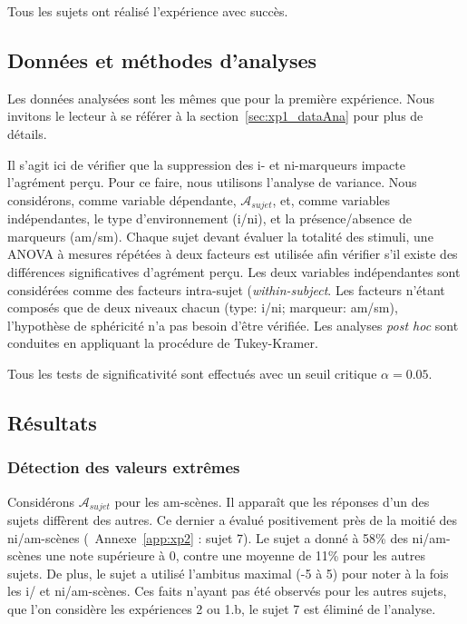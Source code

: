 \documentclass[twoside,twocolumn]{article}
\begin{document}
Tous les sujets ont réalisé l'expérience avec succès. 

\subsection{Données et méthodes d'analyses}

Les données analysées sont les mêmes que pour la première expérience. Nous invitons le lecteur à se référer à la section~\ref{sec:xp1_dataAna} pour plus de détails.
 
Il s'agit ici de vérifier que la suppression des i- et ni-marqueurs impacte l'agrément perçu. Pour ce faire, nous utilisons l'analyse de variance. Nous considérons, comme variable dépendante, $\mathcal{A}_{sujet}$, et, comme variables indépendantes, le type d'environnement (i/ni), et la présence/absence de marqueurs (am/sm). Chaque sujet devant évaluer la totalité des stimuli, une ANOVA à mesures répétées à deux facteurs est utilisée afin vérifier s'il existe des différences significatives d'agrément perçu. Les deux variables indépendantes sont considérées comme des facteurs intra-sujet (\emph{within-subject}. Les facteurs n'étant composés que de deux niveaux chacun (type: i/ni; marqueur: am/sm), l'hypothèse de sphéricité n'a pas besoin d'être vérifiée. Les analyses \emph{post hoc} sont conduites en appliquant la procédure de Tukey-Kramer.

Tous les tests de significativité sont effectués avec un seuil critique $\alpha=0.05$.

\subsection{Résultats}

\subsubsection{Détection des valeurs extrêmes} 

Considérons $\mathcal{A}_{sujet}$ pour les am-scènes. Il apparaît que les réponses d'un des sujets diffèrent des autres. Ce dernier a évalué positivement près de la moitié des ni/am-scènes (\cf~Annexe~\ref{app:xp2} : sujet 7). Le sujet a donné à 58\% des ni/am-scènes une note supérieure à 0, contre une moyenne de 11\% pour les autres sujets. De plus, le sujet a utilisé l'ambitus maximal (-5 à 5) pour noter à la fois les i/ et ni/am-scènes. Ces faits n'ayant pas été observés pour les autres sujets, que l'on considère les expériences 2 ou 1.b, le sujet 7 est éliminé de l'analyse. 
\end{document}
